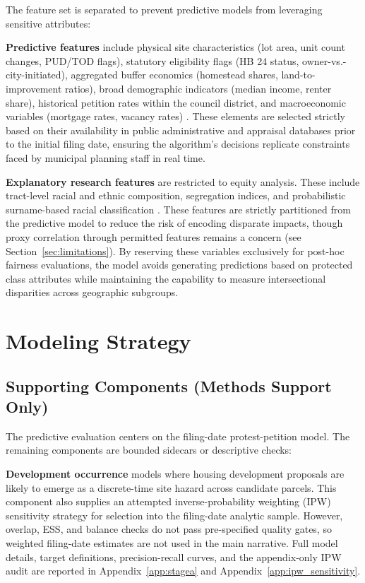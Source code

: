 \documentclass[11pt, letterpaper]{article}
\begin{document}
The feature set is separated to prevent predictive models from leveraging sensitive attributes:

\textbf{Predictive features} include physical site characteristics (lot area, unit count changes, PUD/TOD flags), statutory eligibility flags (HB 24 status, owner-vs.-city-initiated), aggregated buffer economics (homestead shares, land-to-improvement ratios), broad demographic indicators (median income, renter share), historical petition rates within the council district, and macroeconomic variables (mortgage rates, vacancy rates) \cite{fredmacro}. These elements are selected strictly based on their availability in public administrative and appraisal databases prior to the initial filing date, ensuring the algorithm's decisions replicate constraints faced by municipal planning staff in real time.

\textbf{Explanatory research features} are restricted to equity analysis. These include tract-level racial and ethnic composition, segregation indices, and probabilistic surname-based racial classification \cite{sood2018ethnicolr}. These features are strictly partitioned from the predictive model to reduce the risk of encoding disparate impacts, though proxy correlation through permitted features remains a concern (see Section~\ref{sec:limitations}). By reserving these variables exclusively for post-hoc fairness evaluations, the model avoids generating predictions based on protected class attributes while maintaining the capability to measure intersectional disparities across geographic subgroups.



\section{Modeling Strategy}

\subsection{Supporting Components (Methods Support Only)}
\label{sec:supporting_stages}

The predictive evaluation centers on the filing-date protest-petition model. The remaining components are bounded sidecars or descriptive checks:

\textbf{Development occurrence} models where housing development proposals are likely to emerge as a discrete-time site hazard across \metricBaselineParcels{} candidate parcels. This component also supplies an attempted inverse-probability weighting (IPW) sensitivity strategy for selection into the filing-date analytic sample. However, overlap, ESS, and balance checks do not pass pre-specified quality gates, so weighted filing-date estimates are not used in the main narrative. Full model details, target definitions, precision-recall curves, and the appendix-only IPW audit are reported in Appendix~\ref{app:stagea} and Appendix~\ref{app:ipw_sensitivity}.
\end{document}

